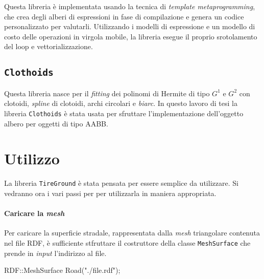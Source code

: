 Questa libreria è implementata usando la tecnica di \textit{template metaprogramming}, che crea degli alberi di espressioni in fase di compilazione e genera un codice personalizzato per valutarli. Utilizzando i modelli di espressione e un modello di costo delle operazioni in virgola mobile, la libreria esegue il proprio srotolamento del loop e vettorializzazione.
%
\subsection{\texttt{Clothoids}}
Questa libreria nasce per il \textit{fitting} dei polinomi di Hermite di tipo $G^1$ e $G^2$ con clotoidi, \textit{spline} di clotoidi, archi circolari e \textit{biarc}. In questo lavoro di tesi la libreria \texttt{Clothoids} è stata usata per sfruttare l'implementazione dell'oggetto albero per oggetti di tipo \ac{AABB}.
%
\section{Utilizzo}
La libreria \texttt{TireGround} è stata pensata per essere semplice da utilizzare. Si vedranno ora i vari passi per per utilizzarla in maniera appropriata.
%
\paragraph{Caricare la \textit{mesh}}
Per caricare la superficie stradale, rappresentata dalla \textit{mesh} triangolare contenuta nel file \ac{RDF}, è sufficiente stfruttare il costruttore della classe \texttt{MeshSurface} che prende in \textit{input} l'indirizzo al file.
\begin{pseudoc}
	RDF::MeshSurface Road("./file.rdf");
\end{pseudoc}
%
